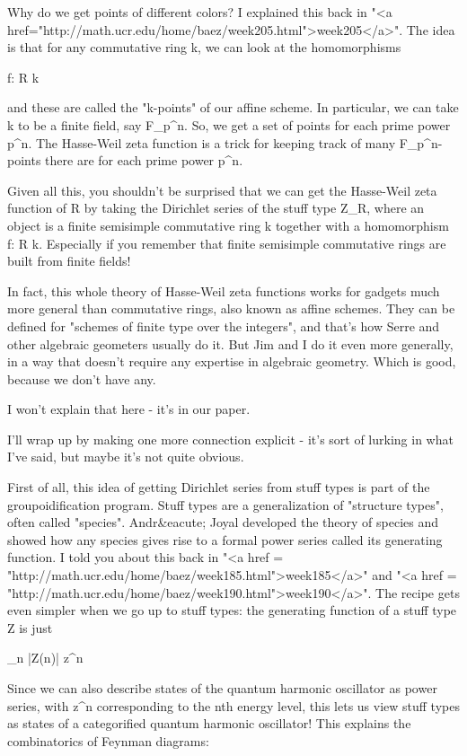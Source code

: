 Why do we get points of different colors?  I explained this back in "<a
href="http://math.ucr.edu/home/baez/week205.html">week205</a>".  
The idea is that for any commutative ring k, we can look at the 
homomorphisms

f: R \to  k

and these are called the "k-points" of our affine scheme.  In
particular, we can take k to be a finite field, say
F_{p^{n}}.  So, we get a set of points for each prime
power p^{n}.  The Hasse-Weil zeta function is a trick for
keeping track of many F_{p^{n}}-points there are for
each prime power p^{n}.

Given all this, you shouldn't be surprised that we can get the
Hasse-Weil zeta function of R by taking the Dirichlet series of the
stuff type Z_{R}, where an object is a finite semisimple
commutative ring k together with a homomorphism f: R \to  k.
Especially if you remember that finite semisimple commutative rings
are built from finite fields!

In fact, this whole theory of Hasse-Weil zeta functions works for
gadgets much more general than commutative rings, also known as affine
schemes.  They can be defined for "schemes of finite type over the
integers", and that's how Serre and other algebraic geometers usually
do it.  But Jim and I do it even more generally, in a way that doesn't
require any expertise in algebraic geometry.   Which is good, because
we don't have any.

I won't explain that here - it's in our paper. 

I'll wrap up by making one more connection explicit - it's sort of
lurking in what I've said, but maybe it's not quite obvious.

First of all, this idea of getting Dirichlet series from stuff types
is part of the groupoidification program.  Stuff types are a
generalization of "structure types", often called "species".
Andr&eacute; Joyal developed the theory of species and showed how any
species gives rise to a formal power series called its generating
function.  I told you about this back in "<a href =
"http://math.ucr.edu/home/baez/week185.html">week185</a>" and
"<a href =
"http://math.ucr.edu/home/baez/week190.html">week190</a>".  The
recipe gets even simpler when we go up to stuff types: the generating
function of a stuff type Z is just

\sum_{n } |Z(n)| z^{n}

Since we can also describe states of the quantum harmonic oscillator
as power series, with z^{n} corresponding to the nth energy
level, this lets us view stuff types as states of a categorified
quantum harmonic oscillator! This explains the combinatorics of
Feynman diagrams:

